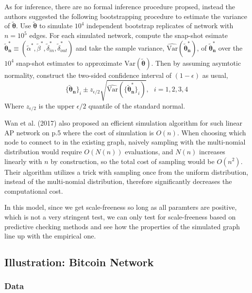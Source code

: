\documentclass[]{elsarticle} %
\begin{document}
As for inference, there are no formal inference procedure propsed,
instead the authors suggested the following bootstrapping procedure to
estimate the variance of \(\boldsymbol{\tilde{\theta}}\). Use
\(\boldsymbol{\tilde{\theta}}\) to simulate \(10^4\) independent
bootstrap replicates of network with \(n = 10^5\) edges. For each
simulated network, compute the snap-shot esimate
\(\boldsymbol{\tilde{\theta}_n^*} \equiv (\tilde{\alpha}^*, \tilde{\beta}^*, \tilde{\delta}_{in}^*, \tilde{\delta}_{out}^*)\)
and take the sample variance,
\(\hat{\text{Var}}(\boldsymbol{\tilde{\theta}_n^*})\), of
\(\boldsymbol{\tilde{\theta}_n^*}\) over the \(10^4\) snap-shot
estimates to approximate \(\text{Var}(\boldsymbol{\tilde{\theta}})\).
Then by assuming asymtotic normality, construct the two-sided confidence
interval of \(( 1 - \epsilon)\) as usual,
\[\{ \boldsymbol{\tilde{\theta}_n}\}_{i} \pm z_{\epsilon/2}\sqrt{\hat{\text{Var}}(\{ \boldsymbol{\tilde{\theta}_n^*}\}_{i})}, \ \ \ i = 1,2,3,4\]
Where \(z_{\epsilon/2}\) is the upper \(\epsilon/2\) quantile of the
standard normal.

Wan et al. (2017) also proposed an efficient simulation algorithm for
such linear AP network on p.5 where the cost of simulation is \(O(n)\).
When choosing which node to connect to in the existing graph, naively
sampling with the multi-nomial distribution would require \(O(N(n))\)
evaluations, and \(N(n)\) increases linearly with \(n\) by construction,
so the total cost of sampling would be \(O(n^2)\). Their algorithm
utilizes a trick with sampling once from the uniform distribution,
instead of the multi-nomial distribution, therefore significantly
decreases the computational cost.

In this model, since we get scale-freeness so long as all paramters are
positive, which is not a very stringent test, we can only test for
scale-freeness based on predictive checking methods and see how the
properties of the simulated graph line up with the empirical one.

\subsection{Illustration: Bitcoin
Network}\label{illustration-bitcoin-network}

\subsubsection{Data}\label{data}
\end{document}
